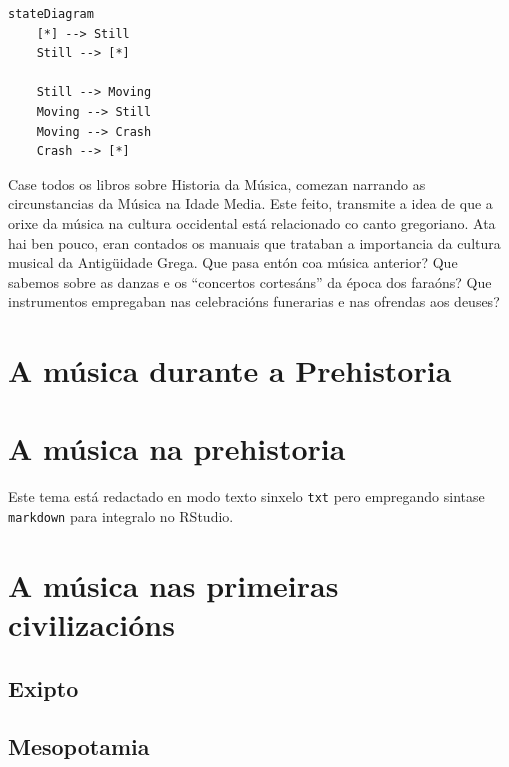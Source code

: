 \documentclass[a4paper, twoside]{templates/ociamthesis}
\theoremstyle{definition}
\theoremstyle{definition}
\theoremstyle{definition}
\theoremstyle{definition}
\theoremstyle{remark}
\begin{document}
\begin{verbatim}
stateDiagram
    [*] --> Still
    Still --> [*]

    Still --> Moving
    Moving --> Still
    Moving --> Crash
    Crash --> [*]
\end{verbatim}

Case todos os libros sobre Historia da Música, comezan narrando as circunstancias da Música na Idade Media. Este feito, transmite a idea de que a orixe da música na cultura occidental está relacionado co canto gregoriano. Ata hai ben pouco, eran contados os manuais que trataban a importancia da cultura musical da Antigüidade Grega. Que pasa entón coa música anterior? Que sabemos sobre as danzas e os ``concertos cortesáns'' da época dos faraóns? Que instrumentos empregaban nas celebracións funerarias e nas ofrendas aos deuses?

\hypertarget{a-muxfasica-durante-a-prehistoria}{%
\section{A música durante a Prehistoria}\label{a-muxfasica-durante-a-prehistoria}}

\hypertarget{a-muxfasica-na-prehistoria}{%
\section{A música na prehistoria}\label{a-muxfasica-na-prehistoria}}

Este tema está redactado en modo texto sinxelo \texttt{txt} pero empregando sintase \texttt{markdown} para integralo no RStudio.

\hypertarget{a-muxfasica-nas-primeiras-civilizaciuxf3ns}{%
\section{A música nas primeiras civilizacións}\label{a-muxfasica-nas-primeiras-civilizaciuxf3ns}}

\hypertarget{exipto}{%
\subsection{Exipto}\label{exipto}}

\hypertarget{mesopotamia}{%
\subsection{Mesopotamia}\label{mesopotamia}}
\end{document}
